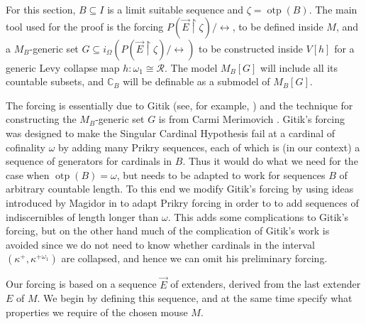 \documentclass[
twoside,
]{article}
\theoremstyle{definition}
\theoremstyle{remark}
\DeclareMathOperator{\otp}{otp}
\newcommand{\ords}{\Omega}
\newcommand\gkeq{\leftrightarrow}
\newcommand\mgkeq{/{\gkeq}}
\newcommand\reals{\mathcal{R}}
\newcommand{\restrict}{{\upharpoonright}}
\newcommand\chang{\mathbb{C}}
\begin{document}
For this section, $B\subseteq I$ is a limit suitable sequence and  $\zeta=\otp(B)$.
The main tool used for the proof is the forcing $P(\vec
E\restrict\zeta)\mgkeq$, to be  defined inside $M$, and a
$M_B$-generic set $G\subseteq i_{\ords}(P(\vec
E\restrict\zeta)\mgkeq)$ to be constructed inside $V[h]$ for a 
generic Levy collapse map  
$h\colon\omega_1\cong \reals$.    The model $M_B[G]$ will include all
its countable subsets, and $\chang_{B}$ will be definable as a
submodel of $M_B[G]$.

The
forcing  is essentially due to Gitik (see, for example,
\cite{Gitik2002Blowing-up-powe}) and the technique for constructing
the $M_B$-generic set $G$ is from Carmi Merimovich
\cite{Merimovich2007Prikry-on-exten}.
Gitik's forcing was designed to make the Singular Cardinal Hypothesis
fail at a cardinal of cofinality 
$\omega$ by adding many Prikry sequences, each of which is (in our
context) a sequence of generators  for cardinals in  $B$.    Thus it
would do what we need for the case when  
$\otp(B)=\omega$,  but  needs to be adapted to work for sequences $B$
of arbitrary countable length.   To this end we modify
Gitik's forcing by using  ideas introduced by Magidor  in
\cite{magidor.changecf} to adapt
Prikry forcing in order to to add sequences of indiscernibles of
length longer  
than $\omega$.   This adds some complications to Gitik's forcing, but
on the other hand much  of the complication of Gitik's
work is avoided since we do not need to know whether cardinals in
the interval $(\kappa^{+}, \kappa^{+\omega_1})$ are collapsed,  and
hence  we can omit his preliminary forcing.

Our forcing is based on a sequence $\vec E$ of extenders, derived from the
last extender $E$ of $M$.   We begin by defining this sequence, and at the
same time  specify  what properties we require of the chosen mouse $M$.
\end{document}
